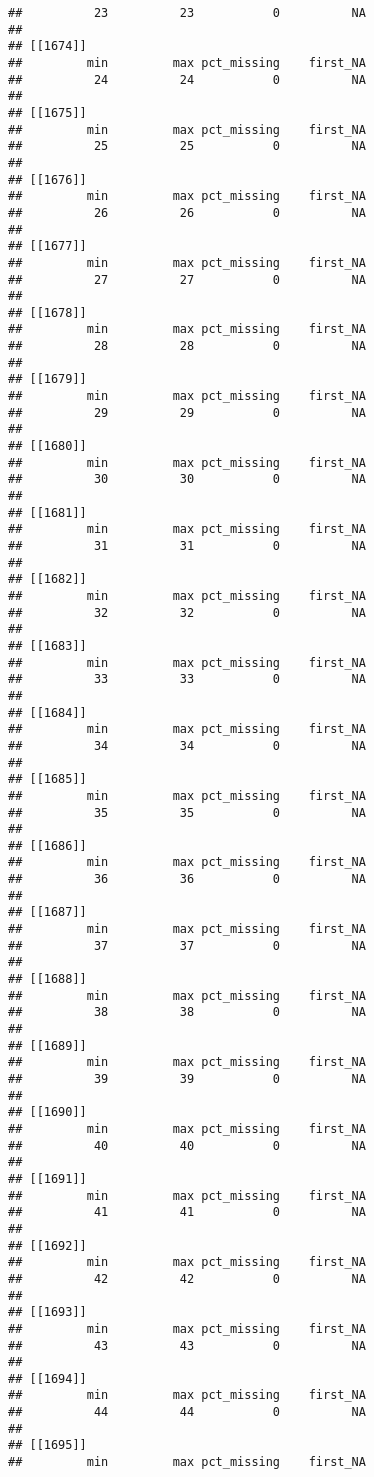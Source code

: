 \documentclass[
]{article}
\begin{document}
\begin{verbatim}
##          23          23           0          NA 
## 
## [[1674]]
##         min         max pct_missing    first_NA 
##          24          24           0          NA 
## 
## [[1675]]
##         min         max pct_missing    first_NA 
##          25          25           0          NA 
## 
## [[1676]]
##         min         max pct_missing    first_NA 
##          26          26           0          NA 
## 
## [[1677]]
##         min         max pct_missing    first_NA 
##          27          27           0          NA 
## 
## [[1678]]
##         min         max pct_missing    first_NA 
##          28          28           0          NA 
## 
## [[1679]]
##         min         max pct_missing    first_NA 
##          29          29           0          NA 
## 
## [[1680]]
##         min         max pct_missing    first_NA 
##          30          30           0          NA 
## 
## [[1681]]
##         min         max pct_missing    first_NA 
##          31          31           0          NA 
## 
## [[1682]]
##         min         max pct_missing    first_NA 
##          32          32           0          NA 
## 
## [[1683]]
##         min         max pct_missing    first_NA 
##          33          33           0          NA 
## 
## [[1684]]
##         min         max pct_missing    first_NA 
##          34          34           0          NA 
## 
## [[1685]]
##         min         max pct_missing    first_NA 
##          35          35           0          NA 
## 
## [[1686]]
##         min         max pct_missing    first_NA 
##          36          36           0          NA 
## 
## [[1687]]
##         min         max pct_missing    first_NA 
##          37          37           0          NA 
## 
## [[1688]]
##         min         max pct_missing    first_NA 
##          38          38           0          NA 
## 
## [[1689]]
##         min         max pct_missing    first_NA 
##          39          39           0          NA 
## 
## [[1690]]
##         min         max pct_missing    first_NA 
##          40          40           0          NA 
## 
## [[1691]]
##         min         max pct_missing    first_NA 
##          41          41           0          NA 
## 
## [[1692]]
##         min         max pct_missing    first_NA 
##          42          42           0          NA 
## 
## [[1693]]
##         min         max pct_missing    first_NA 
##          43          43           0          NA 
## 
## [[1694]]
##         min         max pct_missing    first_NA 
##          44          44           0          NA 
## 
## [[1695]]
##         min         max pct_missing    first_NA 

\end{verbatim}
\end{document}
